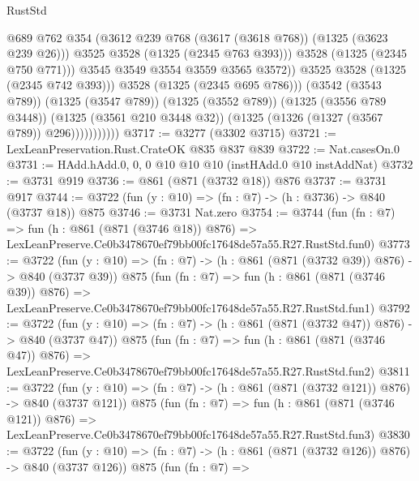 \begin{lexlean}{RustStd}
\begin{coremodule}
                                  @689
                                  @762
                                  @354
                                  (@3612 @239 @768 (@3617 (@3618 @768)) (@1325 (@3623 @239 @26)))
                                  @3525
                                  @3528
                                  (@1325 (@2345 @763 @393)))
                                @3528
                                (@1325 (@2345 @750 @771)))
                              @3545
                              @3549
                              @3554
                              @3559
                              @3565
                              @3572))
                          @3525
                          @3528
                          (@1325 (@2345 @742 @393)))
                        @3528
                        (@1325 (@2345 @695 @786)))
                      (@3542 (@3543 @789))
                      (@1325 (@3547 @789))
                      (@1325 (@3552 @789))
                      (@1325 (@3556 @789 @3448))
                      (@1325 (@3561 @210 @3448 @32))
                      (@1325 (@1326 (@1327 (@3567 @789)) @296)))))))))))
@3717 := @3277 (@3302 @3715)
@3721 := LexLeanPreservation.Rust.CrateOK @835 @837 @839
@3722 := Nat.casesOn.{0}
@3731 := HAdd.hAdd.{0, 0, 0} @10 @10 @10 (instHAdd.{0} @10 instAddNat)
@3732 := @3731 @919
@3736 := @861 (@871 (@3732 @18)) @876
@3737 := @3731 @917
@3744 := @3722 (fun (y : @10) => (fn : @7) -> (h : @3736) -> @840 (@3737 @18)) @875
@3746 := @3731 Nat.zero
@3754 := @3744
    (fun (fn : @7) =>
    fun (h : @861 (@871 (@3746 @18)) @876) =>
    LexLeanPreserve.Ce0b3478670ef79bb00fc17648de57a55.R27.RustStd.fun0)
@3773 := @3722
    (fun (y : @10) => (fn : @7) -> (h : @861 (@871 (@3732 @39)) @876) -> @840 (@3737 @39))
    @875
    (fun (fn : @7) =>
    fun (h : @861 (@871 (@3746 @39)) @876) =>
    LexLeanPreserve.Ce0b3478670ef79bb00fc17648de57a55.R27.RustStd.fun1)
@3792 := @3722
    (fun (y : @10) => (fn : @7) -> (h : @861 (@871 (@3732 @47)) @876) -> @840 (@3737 @47))
    @875
    (fun (fn : @7) =>
    fun (h : @861 (@871 (@3746 @47)) @876) =>
    LexLeanPreserve.Ce0b3478670ef79bb00fc17648de57a55.R27.RustStd.fun2)
@3811 := @3722
    (fun (y : @10) => (fn : @7) -> (h : @861 (@871 (@3732 @121)) @876) -> @840 (@3737 @121))
    @875
    (fun (fn : @7) =>
    fun (h : @861 (@871 (@3746 @121)) @876) =>
    LexLeanPreserve.Ce0b3478670ef79bb00fc17648de57a55.R27.RustStd.fun3)
@3830 := @3722
    (fun (y : @10) => (fn : @7) -> (h : @861 (@871 (@3732 @126)) @876) -> @840 (@3737 @126))
    @875
    (fun (fn : @7) =>

\end{coremodule}
\end{lexlean}
